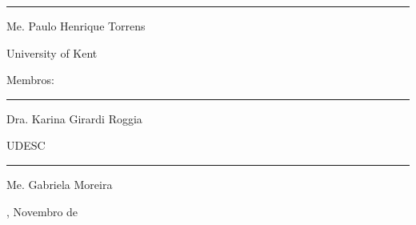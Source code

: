 \begin{folhadeaprovacao}
	\begin{center}
		\begin{minipage}{8.75cm}
			\begin{flushleft}
				\rule{8.75cm}{0.1mm}

				Me. Paulo Henrique Torrens \par
				University of Kent
			\end{flushleft}
		\end{minipage}
	\end{center}

	\vspace*{\baselineskip}
	{Membros:}

	\begin{center}
		\begin{minipage}{8.75cm}
			\begin{flushleft}
				\rule{8.75cm}{0.1mm}

				Dra. Karina Girardi Roggia \par
				UDESC

				\vspace*{1cm}
				\rule{8.75cm}{0.1mm}

				Me. Gabriela Moreira \par
			\end{flushleft}
		\end{minipage}
	\end{center}

	\vspace*{\fill}
	\begin{center}
		{\imprimirlocal, Novembro de \imprimirdata}
	\end{center}
	\vspace*{0.25cm}
\end{folhadeaprovacao}




